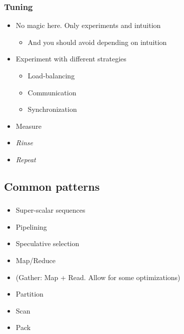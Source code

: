 \begin{frame}
  \frametitle{Tuning}
  \begin{itemize}
  \item No magic here. Only experiments and intuition
    \begin{itemize}
    \item And you should avoid depending on intuition
    \end{itemize}
  \item Experiment with different strategies
    \begin{itemize}
    \item Load-balancing
    \item Communication
    \item Synchronization
    \end{itemize}
  \item Measure
  \item \emph{Rinse}
  \item \emph{Repeat}
  \end{itemize}
\end{frame}


\subsection{Common patterns}
\label{subsec:parpatterns}

\begin{frame}
  \frametitle{}
  \begin{itemize}
  \item Super-scalar sequences
  \item Pipelining
  \item Speculative selection
  \item Map/Reduce
  \item (Gather: Map + Read. Allow for some optimizations)
  \item Partition
  \item Scan
  \item Pack
  \end{itemize}

\end{frame}
